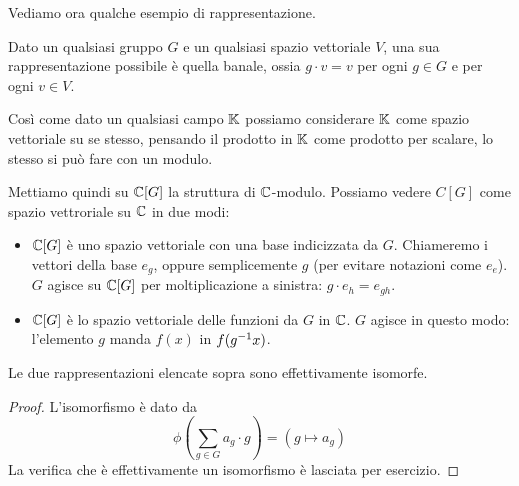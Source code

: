 	Vediamo ora qualche esempio di rappresentazione.

	\begin{myexample}
		Dato un qualsiasi gruppo $G$ e un qualsiasi spazio vettoriale $V$, una sua rappresentazione possibile è quella banale, ossia  $g\cdot v = v$ per ogni $g\in G$ e per ogni $v\in V$.
	\end{myexample}
	\begin{myexample}
		Così come dato un qualsiasi campo $\mathbb K$ possiamo considerare $\mathbb K$ come spazio vettoriale su se stesso, pensando il prodotto in $\mathbb K$ come prodotto per scalare, lo stesso si può fare con un modulo.
		
		Mettiamo quindi su $\bC[G]$ la struttura di $\mathbb C$-modulo. Possiamo vedere $C[G]$ come spazio vettroriale su $\mathbb C$ in due modi:
		\begin{itemize}
		 \item $\bC[G]$ è uno spazio vettoriale con una base indicizzata da $G$. Chiameremo i vettori della base $e_g$, oppure semplicemente $g$ (per evitare notazioni come $e_e$). $G$ agisce su $\bC[G]$ per moltiplicazione a sinistra: $g\cdot e_h = e_{gh}$.
		 \item $\bC[G]$ è lo spazio vettoriale delle funzioni da $G$ in $\mathbb C$. $G$ agisce in questo modo: l'elemento $g$ manda $f(x)$ in $f(g^{-1} x)$.
		\end{itemize}
		
		\begin{myprop}
		 Le due rappresentazioni elencate sopra sono effettivamente isomorfe.
		\end{myprop}
		\begin{proof}
		 L'isomorfismo è dato da \[\phi\left(\sum_{g\in G} a_g\cdot g\right)= \left(g\mapsto a_g\right)\]
		 La verifica che è effettivamente un isomorfismo è lasciata per esercizio.
		\end{proof}


		\iffalse
				Sia $G$ un gruppo finito, e sia $V$ uno spazio vettoriale con base indicizzata da $G$ (ci starebbe una digressione sulla definizione di base). La rappresentazione regolare $\Reg$ è quella rappresentazione che associa a ogni elemento del gruppo l'azione di \emph{moltiplicazione a sinistra} sulla base, ossia $\Reg_g: e_h \mapsto e_{gh}$.
				
				Alternativamente, posso vedere $V$ come lo spazio $\mathbb C[G]$ delle funzioni da $G$ in $\mathbb C$ (l'indentificazione è quella che manda il vettore $\sum_i a_ie_{g_i}$ nella mappa $g_i \mapsto a_i$). In tal caso la rappresentazione regolare diventa
			\[
				\Reg_g(f): x \mapsto  f ( g\inv x) 
				\]
				
				Questa rappresentazione è particolarmente importante perché coincide con $\bC[G]$ visto come $\bC[G]$-modulo, che è sostanzialmente la prima definizione.
				
				Vedremo l'importanza di questa rappresentazione.

		\fi
	\end{myexample}

